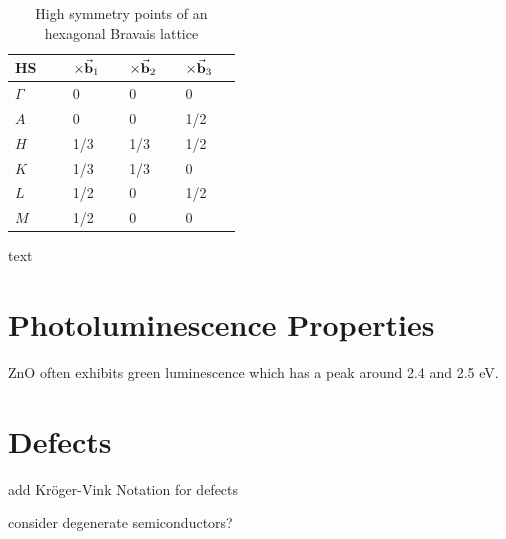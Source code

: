 \begin{table}[tbh!]
	\centering
	\caption{High symmetry points of an hexagonal Bravais lattice}
	\label{tab:HS}
	\begin{tabular}[t]{K{0.15\linewidth}K{0.1\linewidth}K{0.1\linewidth}K{0.1\linewidth}}
	\toprule
	\textbf{HS} & $\times \va{b}_1$ & $\times \va{b}_2$ & $\times \va{b}_3$ \\ \midrule
	$\Gamma$ & 0 & 0 & 0 \\
	$A$ & 0 & 0 & 1/2 \\
	$H$ & 1/3 & 1/3 & 1/2 \\
	$K$ & 1/3 & 1/3 & 0 \\
	$L$ & 1/2 & 0 & 1/2 \\
	$M$ & 1/2 & 0 & 0 \\ \bottomrule
	\end{tabular}%
\end{table}

\clearpage


text
\section{Photoluminescence Properties}
ZnO often exhibits green luminescence which has a peak around 2.4 and 2.5 eV.
\section{Defects}
add Kröger-Vink Notation for defects

consider degenerate semiconductors?

 
